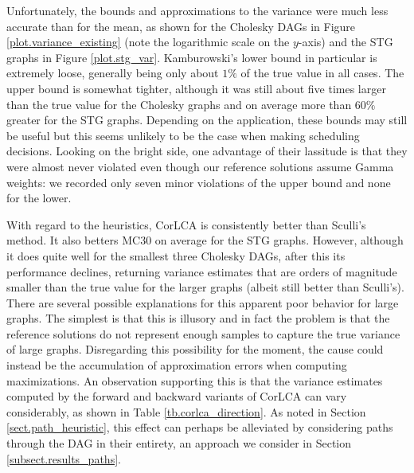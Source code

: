 \documentclass[12pt]{article}
\begin{document}
Unfortunately, the bounds and approximations to the variance were much less accurate than for the mean, as shown for the Cholesky DAGs in Figure \ref{plot.variance_existing} (note the logarithmic scale on the $y$-axis) and the STG graphs in Figure \ref{plot.stg_var}. Kamburowski's lower bound in particular is extremely loose, generally being only about $1\%$ of the true value in all cases. The upper bound is somewhat tighter, although it was still about five times larger than the true value for the Cholesky graphs and on average more than $60\%$ greater for the STG graphs. Depending on the application, these bounds may still be useful but this seems unlikely to be the case when making scheduling decisions. Looking on the bright side, one advantage of their lassitude is that they were almost never violated even though our reference solutions assume Gamma weights: we recorded only seven minor violations of the upper bound and none for the lower.

With regard to the heuristics, CorLCA is consistently better than Sculli's method. It also betters MC30 on average for the STG graphs. However, although it does quite well for the smallest three Cholesky DAGs, after this its performance declines, returning variance estimates that are orders of magnitude smaller than the true value for the larger graphs (albeit still better than Sculli's). There are several possible explanations for this apparent poor behavior for large graphs. The simplest is that this is illusory and in fact the problem is that the reference solutions do not represent enough samples to capture the true variance of large graphs. Disregarding this possibility for the moment, the cause could instead be the accumulation of approximation errors when computing maximizations. An observation supporting this is that the variance estimates computed by the forward and backward variants of CorLCA can vary considerably, as shown in Table \ref{tb.corlca_direction}. As noted in Section \ref{sect.path_heuristic}, this effect can perhaps be alleviated by considering paths through the DAG in their entirety, an approach we consider in Section \ref{subsect.results_paths}. 
\end{document}
